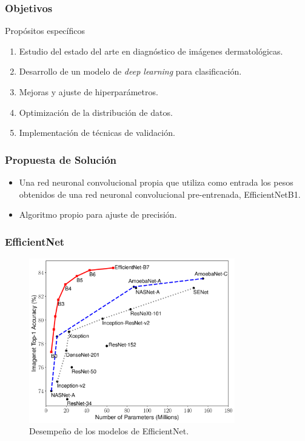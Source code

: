 \documentclass{beamer}
\begin{document}
\begin{frame}
  \frametitle{Objetivos}

    \begin{block}{Propósitos específicos}
      \small
      \begin{enumerate}
        \item<0> Estudio del estado del arte en diagnóstico de imágenes dermatológicas.
        \item<0-> Desarrollo de un modelo de \textit{deep learning} para clasificación.
        \item<0-> Mejoras y ajuste de hiperparámetros.
        \item<0> Optimización de la distribución de datos.
        \item<0> Implementación de técnicas de validación.
      \end{enumerate}
    \end{block}
\end{frame}

\begin{frame}
  \frametitle{Propuesta de Solución}
  \begin{itemize}
    \item <1-> Una red neuronal convolucional propia que utiliza como entrada los pesos obtenidos de una red neuronal convolucional pre-entrenada, EfficientNetB1.
    \item <2-> Algoritmo propio para ajuste de precisión.
  \end{itemize}
\end{frame}

\begin{frame}
  \frametitle{EfficientNet}
  \begin{figure}[H]
    \begin{center}
      \includegraphics[width=0.8\textwidth]{./Graphics/efficientnet_performance.png}
      \caption{Desempeño de los modelos de EfficientNet.}
      \label{fig:pre-trained-cnn}
    \end{center}
  \end{figure}
\end{frame}
\end{document}
